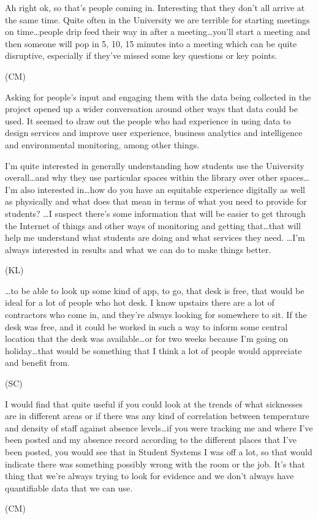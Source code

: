 \begin{qt}Ah right ok, so that’s people coming in. Interesting that they don’t
all arrive at the same time. Quite often in the University we are
terrible for starting meetings on time\ldots people drip feed their way in
after a meeting\ldots you’ll start a meeting and then someone will pop in
5, 10, 15 minutes into a meeting which can be quite disruptive,
especially if they’ve missed some key questions or key points.\end{qt} (CM)

Asking for people’s input and engaging them with the data being
collected in the project opened up a wider conversation around other
ways that data could be used. It seemed to draw out the people who had
experience in using data to design services and improve user
experience, business analytics and intelligence and environmental
monitoring, among other things. 

\begin{qt}I’m quite interested in generally understanding how students use the
University overall\ldots and why they use particular spaces within the
library over other spaces\ldots I’m also interested in\ldots how do you have an
equitable experience digitally as well as physically and what does
that mean in terms of what you need to provide for students? \ldots  I
suspect there’s some information that will be easier to get through
the Internet of things and other ways of monitoring and getting
that\ldots that will help me understand what students are doing and what
services they need. \ldots  I’m always interested in results and what we can
do to make things better.
\end{qt}
(KL) 

\begin{qt}\ldots to be able to look up some kind of app, to go, that desk is free,
that would be ideal for a lot of people who hot desk. I know upstairs
there are a lot of contractors who come in, and they’re always looking
for somewhere to sit. If the desk was free, and it could be worked in
such a way to inform some central location that the desk was
available\ldots or for two weeks because I’m going on holiday\ldots that would be
something that I think a lot of people would appreciate and benefit
from.
\end{qt}
(SC) 

\begin{qt}I would find that quite useful if you could look at the trends of
what sicknesses are in different areas or if there was any kind of
correlation between temperature and density of staff against absence
levels\ldots if you were tracking me and where I’ve been posted and my
absence record according to the different places that I’ve been
posted, you would see that in Student Systems I was off a lot, so that
would indicate there was something possibly wrong with the room or the
job. It’s that thing that we’re always trying to look for evidence and
we don’t always have quantifiable data that we can use.
\end{qt}
(CM) 

